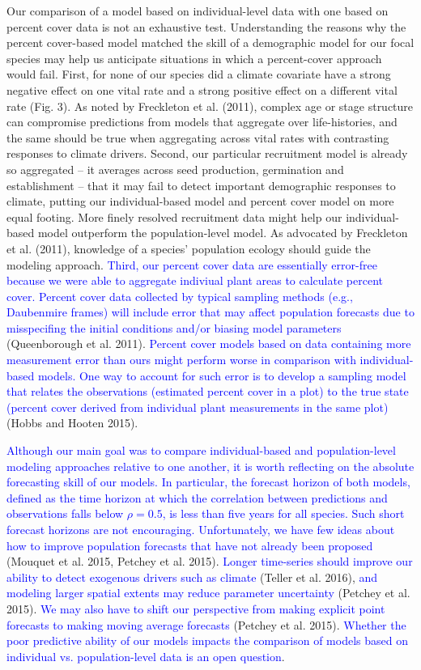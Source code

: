 \documentclass[12pt,]{article}
\begin{document}
Our comparison of a model based on individual-level data with one based
on percent cover data is not an exhaustive test. Understanding the
reasons why the percent cover-based model matched the skill of a
demographic model for our focal species may help us anticipate
situations in which a percent-cover approach would fail. First, for none
of our species did a climate covariate have a strong negative effect on
one vital rate and a strong positive effect on a different vital rate
(Fig. 3). As noted by Freckleton et al. (2011), complex age or stage
structure can compromise predictions from models that aggregate over
life-histories, and the same should be true when aggregating across
vital rates with contrasting responses to climate drivers. Second, our
particular recruitment model is already so aggregated -- it averages
across seed production, germination and establishment -- that it may
fail to detect important demographic responses to climate, putting our
individual-based model and percent cover model on more equal footing.
More finely resolved recruitment data might help our individual-based
model outperform the population-level model. As advocated by Freckleton
et al. (2011), knowledge of a species' population ecology should guide
the modeling approach.
\textcolor{blue}{Third, our percent cover data are essentially error-free because we were able to aggregate indiviual plant areas to calculate percent cover.
Percent cover data collected by typical sampling methods (e.g., Daubenmire frames) will include error that may affect population forecasts due to misspecifing the initial conditions and/or biasing model parameters}
(Queenborough et al. 2011).
\textcolor{blue}{Percent cover models based on data containing more measurement error than ours might perform worse in comparison with individual-based models.
One way to account for such error is to develop a sampling model that relates the observations (estimated percent cover in a plot) to the true state (percent cover derived from individual plant measurements in the same plot)}
(Hobbs and Hooten 2015).

\textcolor{blue}{Although our main goal was to compare individual-based and population-level modeling approaches relative to one another, it is worth reflecting on the absolute forecasting skill of our models.
In particular, the forecast horizon of both models, defined as the time horizon at which the correlation between predictions and observations falls below $\rho = 0.5$, is less than five years for all species. 
Such short forecast horizons are not encouraging.}
\textcolor{blue}{Unfortunately, we have few ideas about how to improve population forecasts that have not already been proposed}
(Mouquet et al. 2015, Petchey et al. 2015).
\textcolor{blue}{Longer time-series should improve our ability to detect exogenous drivers such as climate}
(Teller et al. 2016),
\textcolor{blue}{and modeling larger spatial extents may reduce parameter uncertainty}
(Petchey et al. 2015).
\textcolor{blue}{We may also have to shift our perspective from making explicit point forecasts to making moving average forecasts}
(Petchey et al. 2015).
\textcolor{blue}{Whether the poor predictive ability of our models impacts the comparison of models based on individual vs. population-level data is an open question}.
\end{document}
